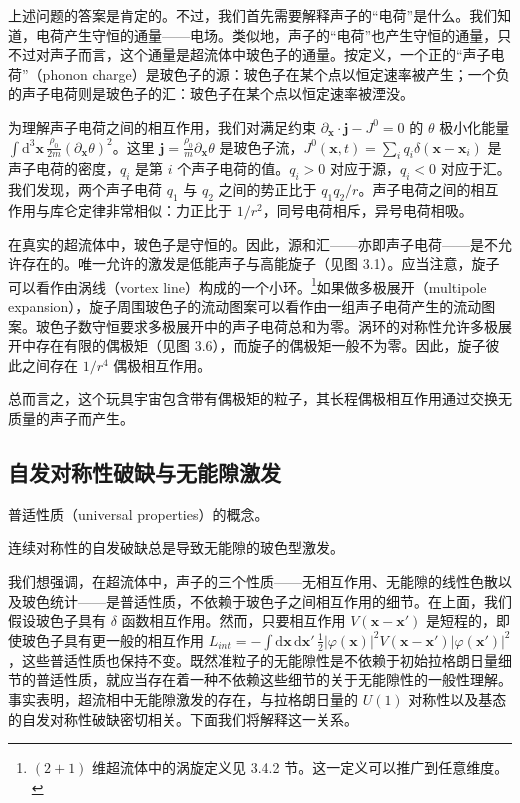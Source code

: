 上述问题的答案是肯定的。不过，我们首先需要解释声子的“电荷”是什么。我们知道，电荷产生守恒的通量——电场。类似地，声子的“电荷”也产生守恒的通量，只不过对声子而言，这个通量是超流体中玻色子的通量。按定义，一个正的“声子电荷”（phonon charge）是玻色子的源：玻色子在某个点以恒定速率被产生；一个负的声子电荷则是玻色子的汇：玻色子在某个点以恒定速率被湮没。

为理解声子电荷之间的相互作用，我们对满足约束 $\partial_{\pmb{x}}\cdot\pmb{j} \allowbreak- J^0 = 0$ 的 $\theta$ 极小化能量 $\int \mathrm{d}^3\pmb{x}\,\allowbreak\frac{\rho_0}{2m}(\partial_{\pmb{x}}\theta)^2$。这里 $\pmb{j} = \frac{\rho_0}{m}\partial_{\pmb{x}}\theta$ 是玻色子流，$J^0(\pmb{x},t) = \sum_i q_i\delta(\pmb{x} - \pmb{x}_i)$ 是声子电荷的密度，$q_i$ 是第 $i$ 个声子电荷的值。$q_i > 0$ 对应于源，$q_i < 0$ 对应于汇。我们发现，两个声子电荷 $q_1$ 与 $q_2$ 之间的势正比于 $q_1q_2/r$。声子电荷之间的相互作用与库仑定律非常相似：力正比于 $1/r^2$，同号电荷相斥，异号电荷相吸。

在真实的超流体中，玻色子是守恒的。因此，源和汇——亦即声子电荷——是不允许存在的。唯一允许的激发是低能声子与高能旋子（见图 3.1）。应当注意，旋子可以看作由涡线（vortex line）构成的一个小环。\footnote{$(2+1)$ 维超流体中的涡旋定义见 3.4.2 节。这一定义可以推广到任意维度。}如果做多极展开（multipole expansion），旋子周围玻色子的流动图案可以看作由一组声子电荷产生的流动图案。玻色子数守恒要求多极展开中的声子电荷总和为零。涡环的对称性允许多极展开中存在有限的偶极矩（见图 3.6），而旋子的偶极矩一般不为零。因此，旋子彼此之间存在 $1/r^4$ 偶极相互作用。

总而言之，这个玩具宇宙包含带有偶极矩的粒子，其长程偶极相互作用通过交换无质量的声子而产生。

\subsection{自发对称性破缺与无能隙激发}

\begin{keypoints}
\item 普适性质（universal properties）的概念。
\item 连续对称性的自发破缺总是导致无能隙的玻色型激发。
\end{keypoints}

我们想强调，在超流体中，声子的三个性质——无相互作用、无能隙的线性色散以及玻色统计——是普适性质，不依赖于玻色子之间相互作用的细节。在上面，我们假设玻色子具有 $\delta$ 函数相互作用。然而，只要相互作用 $V(\pmb{x}-\pmb{x}')$ 是短程的，即使玻色子具有更一般的相互作用 $L_{int} = -\int \mathrm{d}\pmb{x}\,\mathrm{d}\pmb{x}'\,\frac{1}{2}|\varphi(\pmb{x})|^2 V(\pmb{x}-\pmb{x}')|\varphi(\pmb{x}')|^2$，这些普适性质也保持不变。既然准粒子的无能隙性是不依赖于初始拉格朗日量细节的普适性质，就应当存在着一种不依赖这些细节的关于无能隙性的一般性理解。事实表明，超流相中无能隙激发的存在，与拉格朗日量的 $U(1)$ 对称性以及基态的自发对称性破缺密切相关。下面我们将解释这一关系。

